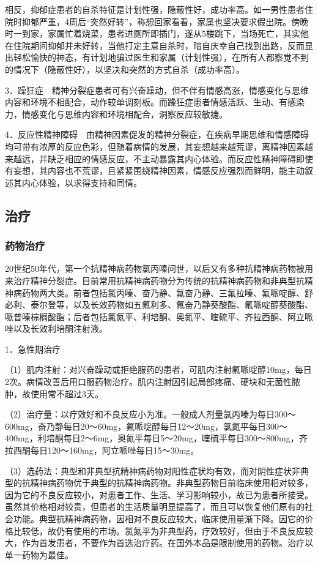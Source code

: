 相反，抑郁症患者的自杀特征是计划性强，隐蔽性好，成功率高。如一男性患者住院时抑郁严重，4周后“突然好转”，称想回家看看，家属也坚决要求假出院。傍晚时一到家，家属忙着烧菜，患者进厕所即插门，遂从5楼跳下，当场死亡，其实他在住院期间抑郁并未好转，当他打定主意自杀时，暗自庆幸自己找到出路，反而显出轻松愉快的神态，有计划地骗过医生和家属（计划性强），在所有人都察觉不到的情况下（隐蔽性好），以坚决和突然的方式自杀（成功率高）。

3．躁狂症　精神分裂症患者可有兴奋躁动，但不伴有情感高涨，情感变化与思维内容和环境不相配合，动作较单调刻板。而躁狂症患者情感活跃、生动、有感染力，情感变化与思维内容和环境相配合，洞察反应较敏捷。

4．反应性精神障碍　由精神因素促发的精神分裂症，在疾病早期思维和情感障碍均可带有浓厚的反应色彩，但随着病情的发展，其妄想越来越荒谬，离精神因素越来越远，并缺乏相应的情感反应，不主动暴露其内心体验。而反应性精神障碍即使有妄想，其内容也不荒谬，且紧紧围绕精神因素，情感反应强烈而鲜明，能主动叙述其内心体验，以求得支持和同情。

\subsection{治疗}

\subsubsection{药物治疗}

20世纪50年代，第一个抗精神病药物氯丙嗪问世，以后又有多种抗精神病药物被用来治疗精神分裂症。目前常用抗精神病药物分为传统的抗精神病药物和非典型抗精神病药物两大类。前者包括氯丙嗪、奋乃静、氟奋乃静、三氟拉嗪、氟哌啶醇、舒必利、泰尔登等，以及长效药物如五氟利多、氟奋乃静葵酸酯、氟哌啶醇葵酸酯、哌普嗪棕榈酸酯；后者包括氯氮平、利培酮、奥氮平、喹硫平、齐拉西酮、阿立哌唑以及长效利培酮注射液。

1．急性期治疗

（1）肌内注射：对兴奋躁动或拒绝服药的患者，可肌内注射氟哌啶醇10mg，每日2次。病情改善后用口服药物治疗。肌内注射因引起局部疼痛、硬块和无菌性脓肿，故使用常不超过3天。

（2）治疗量：以疗效好和不良反应小为准。一般成人剂量氯丙嗪为每日300～600mg，奋乃静每日20～60mg，氟哌啶醇每日12～20mg，氯氮平每日300～400mg，利培酮每日2～6mg，奥氮平每日5～20mg，喹硫平每日300～800mg，齐拉西酮每日120～160mg，阿立哌唑每日15～30mg。

（3）选药法：典型和非典型抗精神病药物对阳性症状均有效，而对阴性症状非典型的抗精神病药物优于典型的抗精神病药物。非典型药物目前临床使用相对较多，因为它的不良反应较小，对患者工作、生活、学习影响较小，故已为患者所接受。虽然其价格相对较贵，但患者的生活质量明显提高了，而且可以恢复他们原有的社会功能。典型抗精神病药物，因相对不良反应较大，临床使用量渐下降。因它的价格比较低，故仍有使用的市场。氯氮平为非典型药，疗效较好，但由于不良反应较大，作为首发患者，不要作为首选治疗药。在国外本品是限制使用的药物。治疗以单一药物为最佳。

